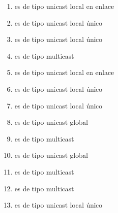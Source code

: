 \documentclass[letterpaper,10pt,spanish]{sphinxmanual}
\begin{document}
\label{\detokenize{t2_integracion_elementos/ejercicios_ips/clasificacion_ipv6:soluciones-a-la-clasificaciones-de-direcciones-ipv6}}\begin{enumerate}
%
\item {} 
\sphinxAtStartPar
{} es de tipo unicast local en enlace

\item {} 
\sphinxAtStartPar
{} es de tipo unicast local único

\item {} 
\sphinxAtStartPar
{} es de tipo unicast local único

\item {} 
\sphinxAtStartPar
{} es de tipo multicast

\item {} 
\sphinxAtStartPar
{} es de tipo unicast local en enlace

\item {} 
\sphinxAtStartPar
{} es de tipo unicast local único

\item {} 
\sphinxAtStartPar
{} es de tipo unicast local único

\item {} 
\sphinxAtStartPar
{} es de tipo unicast global

\item {} 
\sphinxAtStartPar
{} es de tipo multicast

\item {} 
\sphinxAtStartPar
{} es de tipo unicast global

\item {} 
\sphinxAtStartPar
{} es de tipo multicast

\item {} 
\sphinxAtStartPar
{} es de tipo multicast

\item {} 
\sphinxAtStartPar
{} es de tipo unicast local único


\end{enumerate}
\end{document}
